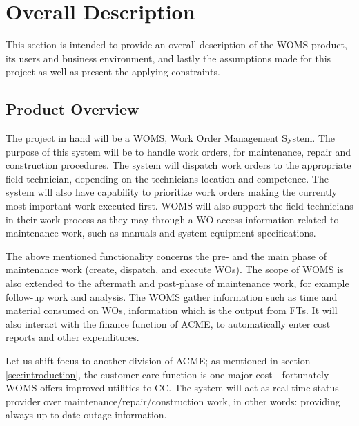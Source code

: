 \section{Overall Description}
\label{sec:overall_description}
This section is intended to provide an overall description of the WOMS product, its users and business environment, and lastly the assumptions made for this project as well as present the applying constraints.
\subsection{Product Overview}
The project in hand will be a WOMS, Work Order Management System.  The purpose of this system will be to handle work orders, for maintenance, repair and construction procedures. The system will dispatch work orders to the appropriate field technician, depending on the technicians location and competence. The system will also have capability to prioritize  work orders  making the currently  most important work executed first. WOMS will also support the field technicians in their work process as they may through a WO access information related to maintenance work, such as manuals and system equipment specifications. 

The above mentioned functionality concerns the pre- and the main phase of maintenance work (create, dispatch, and execute WOs). The scope of WOMS is also extended to the aftermath and post-phase of maintenance work, for example follow-up work and analysis. The WOMS gather information such as time and material consumed on WOs, information which is the output from FTs. It will also interact with the finance function of ACME, to automatically enter cost reports and other expenditures. 

Let us shift focus to another division of ACME; as mentioned in section \ref{sec:introduction}, the customer care function is one major cost - fortunately WOMS offers improved utilities to CC. The system will act as real-time status provider over maintenance/repair/construction work, in other words: providing always up-to-date outage information. 

